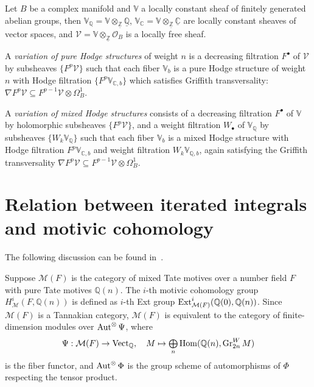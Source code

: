 Let $B$ be a complex manifold and $\mathbb V$ a locally constant sheaf of finitely generated abelian groups, then $\mathbb V_{\mathbb Q}=\mathbb V\otimes_{\underline{\mathbb Z}}\underline{\mathbb Q}$, $\mathbb V_{\mathbb C}=\mathbb V\otimes_{\underline{\mathbb Z}}\underline{\mathbb C}$ are locally constant sheaves of vector spaces, and $\mathcal V=\mathbb V\otimes_{\underline{\mathbb Z}}\mathcal O_B$ is a locally free sheaf.

\begin{definition}
A \textit{variation of pure Hodge structures} of weight $n$ is a decreasing filtration $F^\bullet$ of $\mathcal V$ by subsheaves $\{F^p\mathcal V\}$ such that each fiber $\mathbb V_{b}$ is a pure Hodge structure of weight $n$ with Hodge filtration $\{F^p\mathbb V_{\mathbb C,b}\}$ which satisfies Griffith transversality: $\nabla F^p\mathcal V\subseteq F^{p-1}\mathcal V\otimes\Omega^1_B$.
\end{definition}

\begin{definition}
A \textit{variation of mixed Hodge structures} consists of a decreasing filtration $F^\bullet$ of $\mathbb V$ by holomorphic subsheaves $\{F^p\mathcal V\}$, and a weight filtration $W_\bullet$ of $\mathbb V_{\mathbb Q}$ by subsheaves $\{W_k\mathbb V_{\mathbb Q}\}$ such that each fiber $\mathbb V_b$ is a mixed Hodge structure with Hodge filtration $F^p\mathbb V_{\mathbb C,b}$ and weight filtration $W_k\mathbb V_{\mathbb Q,b}$, again satisfying the Griffith transversality $\nabla F^p\mathcal V\subseteq F^{p-1}\mathcal V\otimes\Omega^1_B$.
\end{definition}


\section{Relation between iterated integrals and motivic cohomology}

The following discussion can be found in~\cite{Goncharov_GaloisSymmetriesOfFundamentalGroupoidsAndNoncommutativeGeometry}.

Suppose $\mathcal M(F)$ is the category of mixed Tate motives over a number field $F$ with pure Tate motives $\mathbb Q(n)$. The $i$-th motivic cohomology group $H^i_{\mathcal M}(F,\mathbb Q(n))$ is defined as $i$-th Ext group $\operatorname{Ext}^i_{\mathcal M(F)}(\mathbb Q(0),\mathbb Q(n))$. Since $\mathcal M(F)$ is a Tannakian category, $\mathcal M(F)$ is equivalent to the category of finite-dimension modules over $\operatorname{Aut}^{\otimes}\Psi$, where
\[
\Psi:\mathcal M(F)\to\operatorname{Vect}_{\mathbb Q},\quad M\mapsto\textstyle\bigoplus\limits_n\operatorname{Hom}(\mathbb Q(n),\operatorname{Gr}^W_{2n}M)
\]
is the fiber functor, and $\operatorname{Aut}^{\otimes}\Phi$ is the group scheme of automorphisms of $\Phi$ respecting the tensor product.

